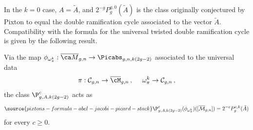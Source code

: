 In the $k=0$ case, $A=\tilde{A}$, and
$2^{-g} P_g^{g,0}(\tilde{A})$ is the
class originally conjectured by Pixton to
equal the double ramification cycle associated to the vector $\tilde A$. Compatibility with the formula for the universal twisted double ramification cycle is given by the
following result.

\begin{proposition}
\notready \label{Prop:PixtonPullbackCompatibility}
Via the map $\phi_{\omega_\pi^k}: \Mbar_{g,n} \to \Picabs_{g,n,k(2g-2)}$ associated to the universal data
\[\pi: \mathcal{C}_{g,n} \rightarrow \overline{\cM}_{g,n}\, , \ \ \ \ \omega_\pi^k \rightarrow \mathcal{C}_{g,n}\, ,\]
the class $\P_{g,A,k(2g-2)}^c$ acts as
\begin{equation} \label{eqn:PixtonPullbackCompatibility}
\source{pixtons-formula-abel-jacobi-picard-stack}
\P_{g,A,k(2g-2)}^c(\phi_{\omega_\pi^k})([\overline{\mathcal{M}}_{g,n}])=2^{-c} P_g^{c,k}(\tilde A)
\end{equation}
for every $c \geq 0$.
\end{proposition}
